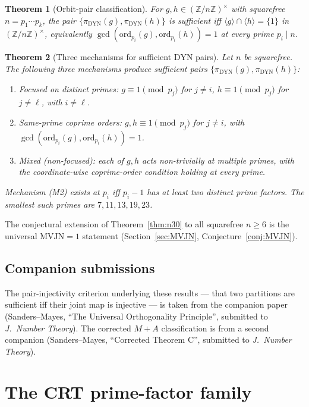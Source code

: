 \documentclass[11pt,reqno]{amsart}
\theoremstyle{plain}
\newtheorem{theorem}{Theorem}
\theoremstyle{definition}
\newcommand{\Z}{\mathbb{Z}}
\newcommand{\Zns}{(\Z/n\Z)^{\times}}
\newcommand{\DYN}{\mathrm{DYN}}
\newcommand{\ord}{\mathrm{ord}}
\begin{document}
\begin{theorem}[Orbit-pair classification] \label{thm:orbit-pair}
For $g, h \in \Zns$ with squarefree $n = p_1 \cdots p_k$, the pair $\{\pi_{\DYN}(g), \pi_{\DYN}(h)\}$ is sufficient iff $\langle g \rangle \cap \langle h \rangle = \{1\}$ in $\Zns$, equivalently $\gcd(\ord_{p_i}(g), \ord_{p_i}(h)) = 1$ at every prime $p_i \mid n$.
\end{theorem}

\begin{theorem}[Three mechanisms for sufficient $\DYN$ pairs] \label{thm:mechanisms}
Let $n$ be squarefree. The following three mechanisms produce sufficient pairs $\{\pi_{\DYN}(g), \pi_{\DYN}(h)\}$:
\begin{enumerate}[label=\textup{(M\arabic*)}]
\item \emph{Focused on distinct primes}: $g \equiv 1 \pmod{p_j}$ for $j \neq i$, $h \equiv 1 \pmod{p_j}$ for $j \neq \ell$, with $i \neq \ell$.
\item \emph{Same-prime coprime orders}: $g, h \equiv 1 \pmod{p_j}$ for $j \neq i$, with $\gcd(\ord_{p_i}(g), \ord_{p_i}(h)) = 1$.
\item \emph{Mixed (non-focused)}: each of $g, h$ acts non-trivially at multiple primes, with the coordinate-wise coprime-order condition holding at every prime.
\end{enumerate}
Mechanism \textup{(M2)} exists at $p_i$ iff $p_i - 1$ has at least two distinct prime factors. The smallest such primes are $7, 11, 13, 19, 23$.
\end{theorem}

The conjectural extension of Theorem~\ref{thm:n30} to all squarefree $n \geq 6$ is the universal $\mathrm{MVJN} = 1$ statement (Section~\ref{sec:MVJN}, Conjecture~\ref{conj:MVJN}).

\subsection{Companion submissions}

The pair-injectivity criterion underlying these results --- that two partitions are sufficient iff their joint map is injective --- is taken from the companion paper (Sanders--Mayes, ``The Universal Orthogonality Principle'', submitted to \emph{J.\ Number Theory}). The corrected $M{+}A$ classification is from a second companion (Sanders--Mayes, ``Corrected Theorem C'', submitted to \emph{J.\ Number Theory}).

\section{The CRT prime-factor family} \label{sec:crt-rigid}
\end{document}

